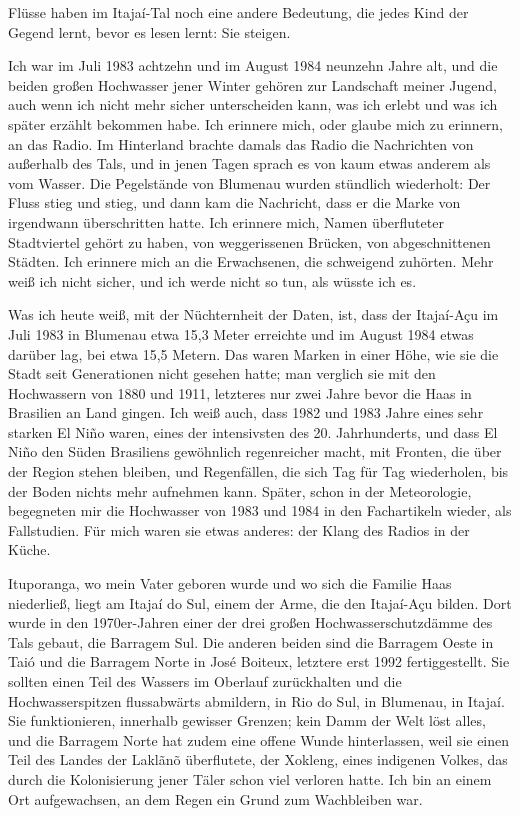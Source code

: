 \documentclass[
  ngerman,
  11pt,
  openany]{book}
\begin{document}
Flüsse haben im Itajaí-Tal noch eine andere Bedeutung, die jedes Kind
der Gegend lernt, bevor es lesen lernt: Sie steigen.

Ich war im Juli 1983 achtzehn und im August 1984 neunzehn Jahre alt, und
die beiden großen Hochwasser jener Winter gehören zur Landschaft meiner
Jugend, auch wenn ich nicht mehr sicher unterscheiden kann, was ich
erlebt und was ich später erzählt bekommen habe. Ich erinnere mich, oder
glaube mich zu erinnern, an das Radio. Im Hinterland brachte damals das
Radio die Nachrichten von außerhalb des Tals, und in jenen Tagen sprach
es von kaum etwas anderem als vom Wasser. Die Pegelstände von Blumenau
wurden stündlich wiederholt: Der Fluss stieg und stieg, und dann kam die
Nachricht, dass er die Marke von irgendwann überschritten hatte. Ich
erinnere mich, Namen überfluteter Stadtviertel gehört zu haben, von
weggerissenen Brücken, von abgeschnittenen Städten. Ich erinnere mich an
die Erwachsenen, die schweigend zuhörten. Mehr weiß ich nicht sicher,
und ich werde nicht so tun, als wüsste ich es.

Was ich heute weiß, mit der Nüchternheit der Daten, ist, dass der
Itajaí-Açu im Juli 1983 in Blumenau etwa 15,3 Meter erreichte und im
August 1984 etwas darüber lag, bei etwa 15,5 Metern. Das waren Marken in
einer Höhe, wie sie die Stadt seit Generationen nicht gesehen hatte; man
verglich sie mit den Hochwassern von 1880 und 1911, letzteres nur zwei
Jahre bevor die Haas in Brasilien an Land gingen. Ich weiß auch, dass
1982 und 1983 Jahre eines sehr starken El Niño waren, eines der
intensivsten des 20. Jahrhunderts, und dass El Niño den Süden Brasiliens
gewöhnlich regenreicher macht, mit Fronten, die über der Region stehen
bleiben, und Regenfällen, die sich Tag für Tag wiederholen, bis der
Boden nichts mehr aufnehmen kann. Später, schon in der Meteorologie,
begegneten mir die Hochwasser von 1983 und 1984 in den Fachartikeln
wieder, als Fallstudien. Für mich waren sie etwas anderes: der Klang des
Radios in der Küche.

Ituporanga, wo mein Vater geboren wurde und wo sich die Familie Haas
niederließ, liegt am Itajaí do Sul, einem der Arme, die den Itajaí-Açu
bilden. Dort wurde in den 1970er-Jahren einer der drei großen
Hochwasserschutzdämme des Tals gebaut, die Barragem Sul. Die anderen
beiden sind die Barragem Oeste in Taió und die Barragem Norte in José
Boiteux, letztere erst 1992 fertiggestellt. Sie sollten einen Teil des
Wassers im Oberlauf zurückhalten und die Hochwasserspitzen flussabwärts
abmildern, in Rio do Sul, in Blumenau, in Itajaí. Sie funktionieren,
innerhalb gewisser Grenzen; kein Damm der Welt löst alles, und die
Barragem Norte hat zudem eine offene Wunde hinterlassen, weil sie einen
Teil des Landes der Laklãnõ überflutete, der Xokleng, eines indigenen
Volkes, das durch die Kolonisierung jener Täler schon viel verloren
hatte. Ich bin an einem Ort aufgewachsen, an dem Regen ein Grund zum
Wachbleiben war.
\end{document}
